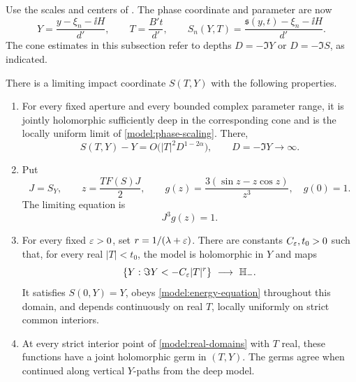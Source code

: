 Use the scales and centers of .  The phase
coordinate and parameter are now
\begin{equation}
\label{model:phase-scaling}
 Y=\frac{y-\xi_n-\ii H}{d'},\qquad
 T=\frac{B't}{d'},\qquad
 S_n(Y,T)=\frac{\mathfrak s(y,t)-\xi_n-\ii H}{d'}.
\end{equation}
The cone estimates in this subsection refer to depths
\(D=-\Im Y\) or \(D=-\Im S\), as indicated.

\begin{proposition}
\label{prop:pure-model}
There is a limiting impact coordinate \(S(T,Y)\) with the following
properties.

\begin{enumerate}[label=\textup{(\roman*)}]
\item For every fixed aperture and every bounded complex parameter
range, it is jointly holomorphic sufficiently deep in the corresponding
cone and is the locally uniform limit of \eqref{model:phase-scaling}.
There,
\begin{equation}
\label{model:deep-anchor}
 S(T,Y)-Y=O\bigl(|T|^2D^{1-2\alpha}\bigr),
\qquad D=-\Im Y\longrightarrow\infty.
\end{equation}

\item Put
\begin{equation}
\label{model:energy}
 J=S_Y,\qquad z=\frac{TF(S)J}{2},\qquad
 g(z)=\frac{3(\sin z-z\cos z)}{z^3},\quad g(0)=1.
\end{equation}
The limiting equation is
\begin{equation}
\label{model:energy-equation}
 J^3g(z)=1.
\end{equation}

\item For every fixed \(\varepsilon>0\), set \(r=1/(\lambda+\varepsilon)\).
There are constants \(C_\varepsilon,t_0>0\) such that, for every real
\(|T|<t_0\), the model is holomorphic in \(Y\) and maps
\begin{equation}
\label{model:real-domains}
 \{Y:\Im Y<-C_\varepsilon|T|^r\}\ \longrightarrow\ \mathbb H_-.
\end{equation}
It satisfies \(S(0,Y)=Y\), obeys
\eqref{model:energy-equation} throughout this domain, and depends
continuously on real \(T\), locally uniformly on strict common
interiors.

\item At every strict interior point of \eqref{model:real-domains}
with \(T\) real, these functions have a joint holomorphic germ in
\((T,Y)\).  The germs agree when continued along vertical \(Y\)-paths
from the deep model.
\end{enumerate}
\end{proposition}

